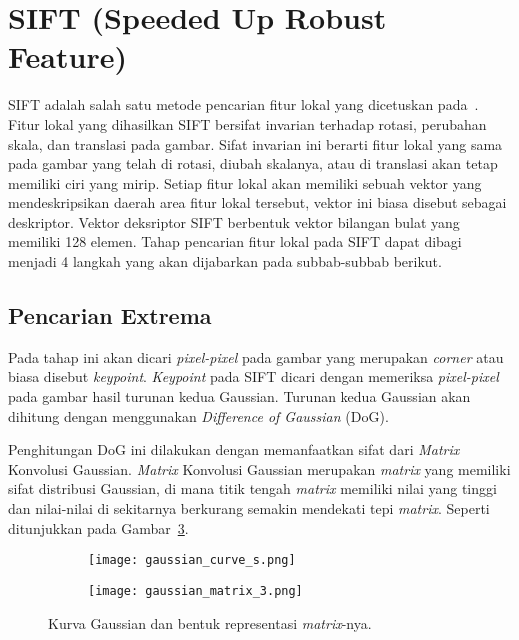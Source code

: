 \section{SIFT (Speeded Up Robust Feature)}
\label{sec:sift}

SIFT adalah salah satu metode pencarian fitur lokal yang dicetuskan pada~\cite{lowe2004sift}. Fitur lokal yang dihasilkan SIFT bersifat invarian terhadap rotasi, perubahan skala, dan translasi pada gambar. Sifat invarian ini berarti fitur lokal yang sama pada gambar yang telah di rotasi, diubah skalanya, atau di translasi akan tetap memiliki ciri yang mirip. Setiap fitur lokal akan memiliki sebuah vektor yang mendeskripsikan daerah area fitur lokal tersebut, vektor ini biasa disebut sebagai deskriptor. Vektor deksriptor SIFT berbentuk vektor bilangan bulat yang memiliki 128 elemen. Tahap pencarian fitur lokal pada SIFT dapat dibagi menjadi 4 langkah yang akan dijabarkan pada subbab-subbab berikut.

\subsection{Pencarian Extrema}
Pada tahap ini akan dicari \textit{pixel-pixel} pada gambar yang merupakan \textit{corner} atau biasa disebut \textit{keypoint}. \textit{Keypoint} pada SIFT dicari dengan memeriksa \textit{pixel-pixel} pada gambar hasil turunan kedua Gaussian. Turunan kedua Gaussian akan dihitung dengan menggunakan \textit{Difference of Gaussian} (DoG).

Penghitungan DoG ini dilakukan dengan memanfaatkan sifat dari \textit{Matrix} Konvolusi Gaussian. \textit{Matrix} Konvolusi Gaussian merupakan \textit{matrix} yang memiliki sifat distribusi Gaussian, di mana titik tengah \textit{matrix} memiliki nilai yang tinggi dan nilai-nilai di sekitarnya berkurang semakin mendekati tepi \textit{matrix}. Seperti ditunjukkan pada Gambar~\ref{fig:gaussian_function}. 
\begin{figure}[H]
	\begin{subfigure}[b]{.5\textwidth}
		\centering
		\texttt{[image: gaussian\_curve\_s.png]}
		\caption{}
		\label{subfig:gaussian_curve}
	\end{subfigure}%
	\begin{subfigure}[b]{.5\textwidth}
		\centering
		\texttt{[image: gaussian\_matrix\_3.png]}
		\caption{}
		\label{subfig:gaussian_matrix}
	\end{subfigure}
	\caption{Kurva Gaussian dan bentuk representasi \textit{matrix}-nya.}
	\label{fig:gaussian_function}
\end{figure}


